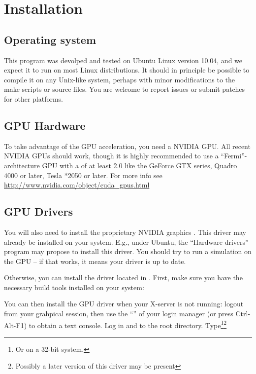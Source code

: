 \section{Installation}


\subsection{Operating system}

This program was devolped and tested on Ubuntu Linux version 10.04, and we expect it to run on most Linux distributions. It should in principle be possible to compile it on any Unix-like system, perhaps with minor modifications to the make scripts or source files. You are welcome to report issues or submit patches for other platforms.

\subsection{GPU Hardware}

To take advantage of the GPU acceleration, you need a  \textsc{NVIDIA} GPU. All recent \textsc{NVIDIA} GPUs should work, though it is highly recommended to use a ``Fermi''-architecture GPU with a  of at least 2.0 like the GeForce GTX series, Quadro 4000 or later, Tesla *2050 or later. For more info see \url{http://www.nvidia.com/object/cuda_gpus.html}

\subsection{GPU Drivers}

You will also need to install the proprietary \textsc{NVIDIA} graphics . This driver may already be installed on your system. E.g., under Ubuntu, the ``Hardware drivers'' program may propose to install this driver. You should try to run a simulation on the GPU -- if that works, it means your driver is up to date.

Otherwise, you can install the driver located in . First, make sure you have the necessary build tools installed on your system:


You can then install the GPU driver when your X-server is not running: logout from your grahpical session, then use the ``'' of your login manager (or press Ctrl-Alt-F1) to obtain a text console. Log in and  to  the \prog root directory. Type\footnote{Or  on a 32-bit system.}\footnote{Possibly a later version of this driver may be present}

